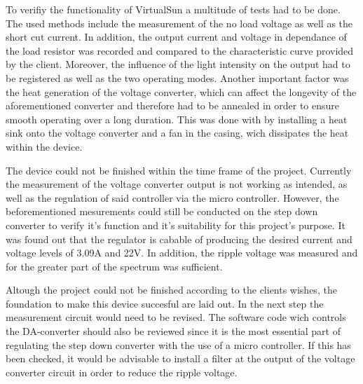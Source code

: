 \documentclass[a4paper]{fhnwreport}
\begin{document}
To verifiy the functionality of VirtualSun a multitude of tests had to be done. The used methods include the measurement of the no load voltage as well as the short cut current. In addition, the output current and voltage in dependance of the load resistor was recorded and compared to the characteristic curve provided by the client.  Moreover, the influence of the light intensity on the output had to be registered as well as the two operating modes. Another important factor was the heat generation of the voltage converter, which can affect the longevity of the aforementioned converter and therefore had to be annealed in order to ensure smooth operating over a long duration. This was done with by installing a heat sink onto the voltage converter and a fan in the casing, wich dissipates the heat within the device.

The device could not be finished within the time frame of the project. Currently the measurement of the voltage converter output is not working as intended, as well as the regulation of said controller via the micro controller. However, the beforementioned mesurements could still be conducted on the step down converter to verify it's function and it's suitability for this project's purpose. It was found out that the regulator is cabable of producing the desired current and voltage levels of 3.09A and 22V. In addition, the ripple voltage was measured and for the greater part of the spectrum was sufficient.

Altough the project could not be finished according to the clients wishes, the foundation to make this device succesful are laid out. In the next step the measurement circuit would need to be revised. The software code wich controls the DA-converter should also be reviewed since it is the most essential part of regulating the step down converter with the use of a micro controller. If this has been checked, it would be advisable to install a filter at the output of the voltage converter circuit in order to reduce the ripple voltage.

 
\end{document}
